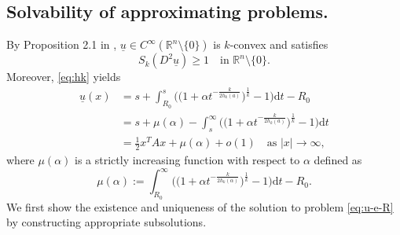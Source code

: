 \documentclass[reqno]{amsart}
\theoremstyle{remark}
\theoremstyle{definition}
\numberwithin{equation}{section}
\begin{document}
\subsection{Solvability of approximating problems.}\label{subsec:solvability}
By Proposition 2.1 in \cite{Bao-Li-Li}, $\underline{u}\in C^{\infty}(\mathbb{R}^n\setminus\{0\})$ is $k$-convex and satisfies
\begin{equation}\label{eq:sub-0}
	S_k(D^2\underline{u})\geq1\quad\text{in }\mathbb{R}^n\setminus\{0\}.
\end{equation}
 Moreover, \eqref{eq:hk} yields
\begin{equation}\label{eq:subsol-u-2}
	\begin{split}
	\underline{u} (x) & =s+\int_{R_0}^{s}\bigg(\bigg(1+\alpha t^{-\frac{k}{2h_k(a)}}\bigg)^\frac{1}{k}-1\bigg)\mathrm{d}t-R_0\\
	& = s+\mu(\alpha)-\int_s^\infty\bigg(\bigg(1+\alpha t^{-\frac{k}{2h_k(a)}}\bigg)^\frac{1}{k}-1\bigg)\mathrm{d}t \\
	& = \frac{1}{2}x^TAx + \mu(\alpha) + o(1)\quad\text{as }|x|\to\infty,
	\end{split}
\end{equation}  
where $\mu(\alpha)$ is a strictly increasing function with respect to $\alpha$ defined as
$$\mu(\alpha):= \int_{R_0}^{\infty} \bigg( \bigg( 1 + \alpha t^{-\frac{k}{2h_k(\alpha)}} \bigg)^{\frac{1}{k}} - 1 \bigg) \mathrm{d}t-R_0.$$
We first show the existence and uniqueness of the solution to problem \eqref{eq:u-e-R} by constructing appropriate subsolutions.
\end{document}
